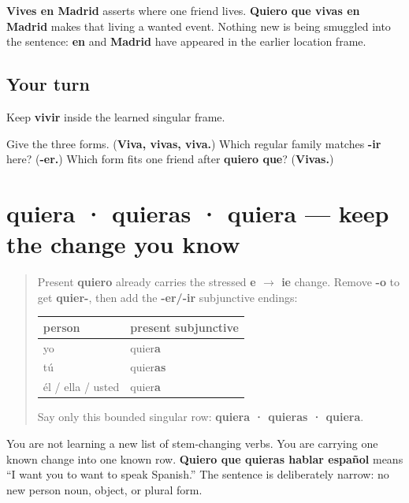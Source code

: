 \begin{grammarlens}[title={Grammar Lens: meaning in a known frame}]
\textbf{Vives en Madrid} asserts where one friend lives. \textbf{Quiero que vivas en Madrid} makes that living a wanted event. Nothing new is being smuggled into the sentence: \textbf{en} and \textbf{Madrid} have appeared in the earlier location frame.
\end{grammarlens}

\subsection*{Your turn}
Keep \textbf{vivir} inside the learned singular frame.

\begin{tcolorbox}[breakable,colback=teal!4,colframe=teal!35!black,title={Before you move on}]
Give the three forms. (\textbf{Viva, vivas, viva.}) Which regular family matches \textbf{-ir} here? (\textbf{-er.}) Which form fits one friend after \textbf{quiero que}? (\textbf{Vivas.})
\end{tcolorbox}
\section[quiera · quieras · quiera]{quiera · quieras · quiera — keep the change you know}

\label{lesson:ES-C18-querer-subjuntivo}



\begin{quote}
Present \textbf{quiero} already carries the stressed \textbf{e $\to$ ie} change. Remove \textbf{-o} to get \textbf{quier-}, then add the \textbf{-er/-ir} subjunctive endings:

\noindent
\begin{tabularx}{\linewidth}{@{}>{\raggedright\arraybackslash}X>{\raggedright\arraybackslash}X@{}}
\toprule
\textbf{person} & \textbf{present subjunctive} \\
\midrule
yo & quier\textbf{a} \\
tú & quier\textbf{as} \\
él / ella / usted & quier\textbf{a} \\
\bottomrule
\end{tabularx}

Say only this bounded singular row: \textbf{quiera · quieras · quiera}.
\end{quote}

\begin{grammarlens}[title={Grammar Lens: one known verb, one inherited stem}]
You are not learning a new list of stem-changing verbs. You are carrying one known change into one known row. \textbf{Quiero que quieras hablar español} means “I want you to want to speak Spanish.” The sentence is deliberately narrow: no new person noun, object, or plural form.
\end{grammarlens}

